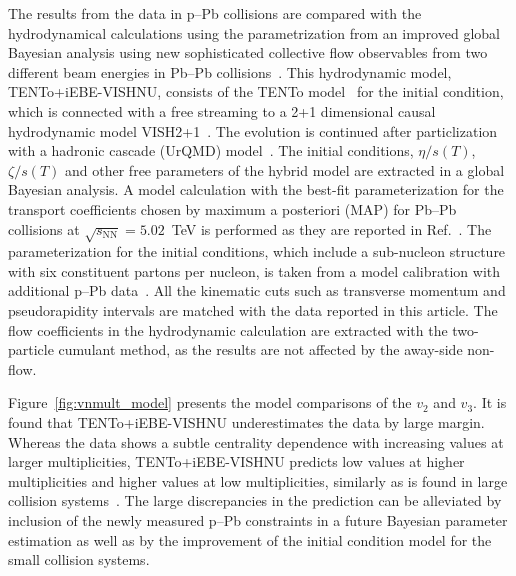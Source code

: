 The results from the data in p--Pb collisions are compared with the hydrodynamical calculations using the parametrization from an improved global Bayesian analysis using new sophisticated collective flow observables from two different beam energies in Pb--Pb collisions~\cite{Parkkila:2021yha}. This hydrodynamic model, {TENTo}+iEBE-VISHNU, consists of the {TENTo} model~\cite{Moreland:2014oya} for the initial condition, which is connected with a free streaming to a 2+1 dimensional causal hydrodynamic model VISH2+1~\cite{Shen:2014vra}. The evolution is continued after particlization with a hadronic cascade (UrQMD) model~\cite{Bass:1998ca,Bleicher:1999xi}. The initial conditions, $\eta/s(T)$, $\zeta/s(T)$ and other free parameters of the hybrid model are extracted in a global Bayesian analysis.
A model calculation with the best-fit parameterization for the transport coefficients chosen by maximum a posteriori (MAP) for Pb--Pb collisions at $\sqrt{s_{\text{NN}}}=5.02$~TeV is performed as they are reported in Ref.~\cite{Parkkila:2021yha}. The parameterization for the initial conditions, which include a sub-nucleon structure with six constituent partons per nucleon, is taken from a model calibration with additional p--Pb data~\cite{Moreland:2018gsh}. All the kinematic cuts such as transverse momentum and pseudorapidity intervals are matched with the data reported in this article. The flow coefficients in the hydrodynamic calculation are extracted with the two-particle cumulant method, as the results are not affected by the away-side non-flow.

Figure~\ref{fig:vnmult_model} presents the model comparisons of the $v_2$ and $v_3$. It is found that {TENTo}+iEBE-VISHNU underestimates the data by large margin. Whereas the data shows a subtle centrality dependence with increasing values at larger multiplicities, {TENTo}+iEBE-VISHNU predicts low values at higher multiplicities and higher values at low multiplicities, similarly as is found in large collision systems~\cite{Acharya:2020taj}. The large discrepancies in the prediction can be alleviated by inclusion of the newly measured p--Pb constraints in a future Bayesian parameter estimation as well as by the improvement of the initial condition model for the small collision systems.

